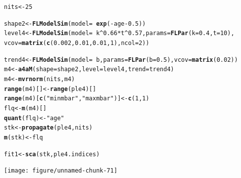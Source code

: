 \documentclass[a4paper,english,10pt]{article}\usepackage[]{graphicx}\usepackage[]{color}
\makeatletter
\newcommand{\hlnum}[1]{\textcolor[rgb]{0.686,0.059,0.569}{#1}}%
\newcommand{\hlstr}[1]{\textcolor[rgb]{0.192,0.494,0.8}{#1}}%
\newcommand{\hlopt}[1]{\textcolor[rgb]{0,0,0}{#1}}%
\newcommand{\hlstd}[1]{\textcolor[rgb]{0.345,0.345,0.345}{#1}}%
\newcommand{\hlkwb}[1]{\textcolor[rgb]{0.69,0.353,0.396}{#1}}%
\newcommand{\hlkwc}[1]{\textcolor[rgb]{0.333,0.667,0.333}{#1}}%
\newcommand{\hlkwd}[1]{\textcolor[rgb]{0.737,0.353,0.396}{\textbf{#1}}}%
\newenvironment{kframe}{%
 \def\at@end@of@kframe{}%
 \ifinner\ifhmode%
  \def\at@end@of@kframe{\end{minipage}}%
  \begin{minipage}{\columnwidth}%
 \fi\fi%
 \def\FrameCommand##1{\hskip\@totalleftmargin \hskip-\fboxsep
 \colorbox{shadecolor}{##1}\hskip-\fboxsep
     \hskip-\linewidth \hskip-\@totalleftmargin \hskip\columnwidth}%
 \MakeFramed {\advance\hsize-\width
   \@totalleftmargin\z@ \linewidth\hsize
   \@setminipage}}%
 {\par\unskip\endMakeFramed%
 \at@end@of@kframe}
\newenvironment{knitrout}{}{} %
\makeatother
\begin{document}
\begin{knitrout}
\color{fgcolor}\begin{kframe}
\begin{alltt}
\hlstd{nits} \hlkwb{<-} \hlnum{25}

\hlstd{shape2} \hlkwb{<-} \hlkwd{FLModelSim}\hlstd{(}\hlkwc{model} \hlstd{=} \hlopt{~}\hlkwd{exp}\hlstd{(}\hlopt{-}\hlstd{age} \hlopt{-} \hlnum{0.5}\hlstd{))}
\hlstd{level4} \hlkwb{<-} \hlkwd{FLModelSim}\hlstd{(}\hlkwc{model} \hlstd{=} \hlopt{~}\hlstd{k}\hlopt{^}\hlnum{0.66} \hlopt{*} \hlstd{t}\hlopt{^}\hlnum{0.57}\hlstd{,} \hlkwc{params} \hlstd{=} \hlkwd{FLPar}\hlstd{(}\hlkwc{k} \hlstd{=} \hlnum{0.4}\hlstd{,} \hlkwc{t} \hlstd{=} \hlnum{10}\hlstd{),}
    \hlkwc{vcov} \hlstd{=} \hlkwd{matrix}\hlstd{(}\hlkwd{c}\hlstd{(}\hlnum{0.002}\hlstd{,} \hlnum{0.01}\hlstd{,} \hlnum{0.01}\hlstd{,} \hlnum{1}\hlstd{),} \hlkwc{ncol} \hlstd{=} \hlnum{2}\hlstd{))}

\hlstd{trend4} \hlkwb{<-} \hlkwd{FLModelSim}\hlstd{(}\hlkwc{model} \hlstd{=} \hlopt{~}\hlstd{b,} \hlkwc{params} \hlstd{=} \hlkwd{FLPar}\hlstd{(}\hlkwc{b} \hlstd{=} \hlnum{0.5}\hlstd{),} \hlkwc{vcov} \hlstd{=} \hlkwd{matrix}\hlstd{(}\hlnum{0.02}\hlstd{))}
\hlstd{m4} \hlkwb{<-} \hlkwd{a4aM}\hlstd{(}\hlkwc{shape} \hlstd{= shape2,} \hlkwc{level} \hlstd{= level4,} \hlkwc{trend} \hlstd{= trend4)}
\hlstd{m4} \hlkwb{<-} \hlkwd{mvrnorm}\hlstd{(nits, m4)}
\hlkwd{range}\hlstd{(m4)[]} \hlkwb{<-} \hlkwd{range}\hlstd{(ple4)[]}
\hlkwd{range}\hlstd{(m4)[}\hlkwd{c}\hlstd{(}\hlstr{"minmbar"}\hlstd{,} \hlstr{"maxmbar"}\hlstd{)]} \hlkwb{<-} \hlkwd{c}\hlstd{(}\hlnum{1}\hlstd{,} \hlnum{1}\hlstd{)}
\hlstd{flq} \hlkwb{<-} \hlkwd{m}\hlstd{(m4)[]}
\hlkwd{quant}\hlstd{(flq)} \hlkwb{<-} \hlstr{"age"}
\hlstd{stk} \hlkwb{<-} \hlkwd{propagate}\hlstd{(ple4, nits)}
\hlkwd{m}\hlstd{(stk)} \hlkwb{<-} \hlstd{flq}

\hlstd{fit1} \hlkwb{<-} \hlkwd{sca}\hlstd{(stk, ple4.indices)}
\end{alltt}
\end{kframe}
\end{knitrout}


\begin{knitrout}
\color{fgcolor}

{\centering \texttt{[image: figure/unnamed-chunk-71]} 

}



\end{knitrout}
\end{document}

